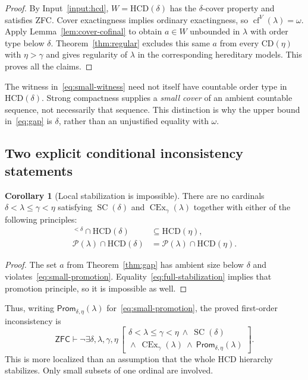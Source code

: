 \documentclass[11pt,letterpaper]{article}
\theoremstyle{definition}
\newtheorem{corollary}[definition]{Corollary}
\newcommand{\ZFC}{\mathsf{ZFC}}
\newcommand{\SC}{\operatorname{SC}}
\newcommand{\CEx}{\operatorname{CEx}}
\newcommand{\cf}{\operatorname{cf}}
\newcommand{\HCD}{\mathrm{HCD}}
\newcommand{\CD}{\mathrm{CD}}
\newcommand{\Pow}{\mathcal{P}}
\newcommand{\Cex}[2]{\CEx_{#1}(#2)}
\theoremstyle{remark}
\begin{document}
\begin{proof}
By Input~\ref{input:hcd}, $W=\HCD(\delta)$ has the $\delta$-cover property and satisfies ZFC. Cover exactingness implies ordinary exactingness, so $\cf^V(\lambda)=\omega$. Apply Lemma~\ref{lem:cover-cofinal} to obtain $a\in W$ unbounded in $\lambda$ with order type below $\delta$. Theorem~\ref{thm:regular} excludes this same $a$ from every $\CD(\eta)$ with $\eta>\gamma$ and gives regularity of $\lambda$ in the corresponding hereditary models. This proves all the claims.
\end{proof}

The witness in~\eqref{eq:small-witness} need not itself have countable order type in $\HCD(\delta)$. Strong compactness supplies a \emph{small cover} of an ambient countable sequence, not necessarily that sequence. This distinction is why the upper bound in~\eqref{eq:gap} is $\delta$, rather than an unjustified equality with $\omega$.

\subsection{Two explicit conditional inconsistency statements}

\begin{corollary}[Local stabilization is impossible]\label{cor:stabilization}
There are no cardinals $\delta<\lambda\leq\gamma<\eta$ satisfying $\SC(\delta)$ and $\Cex{\gamma}{\lambda}$ together with either of the following principles:
\begin{align}
 [\lambda]^{<\delta}\cap\HCD(\delta)
      &\subseteq\HCD(\eta),\label{eq:small-promotion}\\
 \Pow(\lambda)\cap\HCD(\delta)
      &=\Pow(\lambda)\cap\HCD(\eta).\label{eq:full-stabilization}
\end{align}
\end{corollary}

\begin{proof}
The set $a$ from Theorem~\ref{thm:gap} has ambient size below $\delta$ and violates~\eqref{eq:small-promotion}. Equality~\eqref{eq:full-stabilization} implies that promotion principle, so it is impossible as well.
\end{proof}

Thus, writing $\mathsf{Prom}_{\delta,\eta}(\lambda)$ for~\eqref{eq:small-promotion}, the proved first-order inconsistency is
\[
 \ZFC\vdash\neg\exists\delta,\lambda,\gamma,\eta\,
 \left[
 \begin{array}{l}
 \delta<\lambda\leq\gamma<\eta\ \wedge\ \SC(\delta)\\
 {}\wedge\ \Cex{\gamma}{\lambda}
       \ \wedge\ \mathsf{Prom}_{\delta,\eta}(\lambda)
 \end{array}
 \right].
\]
This is more localized than an assumption that the whole HCD hierarchy stabilizes. Only small subsets of one ordinal are involved.
\end{document}
